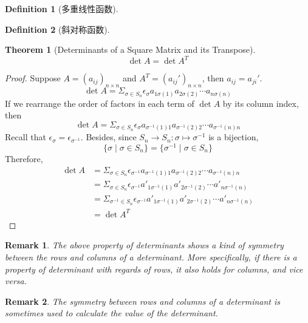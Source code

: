 \documentclass[onecolumn]{ctexart}
\newtheorem{definition}{Definition}
\newtheorem{theorem}{Theorem}
\newtheorem{remark}{Remark}
\begin{document}
\begin{definition}[多重线性函数]
  
\end{definition}

\begin{definition}[斜对称函数]
  
\end{definition}

\begin{theorem}[Determinants of a Square Matrix and its Transpose]
  \[
    \det A = \det A^T
  \]
\end{theorem}
\begin{proof}
  Suppose $A = (a_{ij})_{n \times n}$ and $A^T = (a_{ij}')_{n \times n}$, then 
  $a_{ij} = a_{ji}'$.
  \[
    \det A = \Sigma_{\sigma \in S_n} \epsilon_\sigma a_{1\sigma(1)} a_{2\sigma(2)} \cdots a_{n\sigma(n)}
  \]
  If we rearrange the order of factors in each term of $\det A$ by its column index, then
  \[
    \det A = \Sigma_{\sigma \in S_n} \epsilon_\sigma a_{\sigma^{-1}(1)1} a_{\sigma^{-1}(2)2} \cdots a_{\sigma^{-1}(n)n}
  \]
  Recall that $\epsilon_\sigma = \epsilon_{\sigma^{-1}}$. Besides, since $S_n 
  \to S_n: \sigma \mapsto \sigma^{-1}$ is a bijection, 
  \[
    \lbrace \sigma \mid \sigma \in S_n \rbrace = \lbrace \sigma^{-1} \mid \sigma \in S_n \rbrace
  \]
  Therefore,
  \[
    \begin{split}
      \det A &= \Sigma_{\sigma \in S_n} \epsilon_{\sigma^{-1}} a_{\sigma^{-1}(1)1} a_{\sigma^{-1}(2)2} \cdots a_{\sigma^{-1}(n)n} \\
             &= \Sigma_{\sigma \in S_n} \epsilon_{\sigma^{-1}} a'_{1\sigma^{-1}(1)} a'_{2\sigma^{-1}(2)} \cdots a'_{n\sigma^{-1}(n)} \\
             &= \Sigma_{\sigma^{-1} \in S_n} \epsilon_{\sigma^{-1}} a'_{1\sigma^{-1}(1)} a'_{2\sigma^{-1}(2)} \cdots a'_{n\sigma^{-1}(n)} \\
             &= \det A^T
    \end{split}
  \]
\end{proof}
\begin{remark}
  The above property of determinants shows a kind of symmetry between the rows 
  and columns of a determinant. More specifically, if there is a property of 
  determinant with regards of rows, it also holds for columns, and vice versa.
\end{remark}
\begin{remark}
  The symmetry between rows and columns of a determinant is sometimes used to 
  calculate the value of the determinant.
\end{remark}
\end{document}
